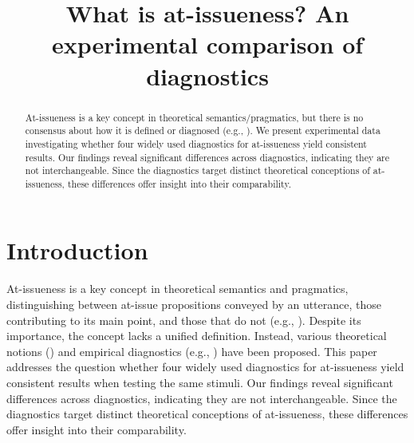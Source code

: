 \documentclass[times,linguex]{glossa}
\title[What is at-issueness?]{What is at-issueness? An experimental comparison of diagnostics\\ 
  }
\author[]%
{%
}
\begin{document}
\maketitle


\begin{abstract}
  At-issueness is a key concept in theoretical semantics/pragmatics, but there is no consensus about how it is defined or diagnosed (e.g., \citealt{tonhauser_diagnosing_2012,tonhauser_how_2018,koev_notions_2018}). We present experimental data investigating whether four widely used diagnostics for at-issueness yield consistent results. Our findings reveal significant differences across diagnostics, indicating they are not interchangeable. Since the diagnostics target distinct theoretical conceptions of at-issueness, these differences offer insight into their comparability.

\end{abstract}


\section{Introduction \label{sec:1_introduction}}
  At-issueness is a key concept in theoretical semantics and pragmatics, distinguishing between at-issue propositions conveyed by an utterance, those contributing to its main point, and those that do not (e.g., \citealt{karttunen_conventional_1979,horton_presuppositions_1988,abbott_presuppositions_2000,faller_semantics_2003,potts_logic_2005,tonhauser_diagnosing_2012}). Despite its importance, the concept lacks a unified definition. Instead, various theoretical notions (\citealt{koev_notions_2018,tonhauser_how_2018}) and empirical diagnostics (e.g., \citealt{tonhauser_diagnosing_2012}) have been proposed. This paper addresses the question whether four widely used diagnostics for at-issueness yield consistent results when testing the same stimuli. Our findings reveal significant differences across diagnostics, indicating they are not interchangeable. Since the diagnostics target distinct theoretical conceptions of at-issueness, these differences offer insight into their comparability.

\end{document}
